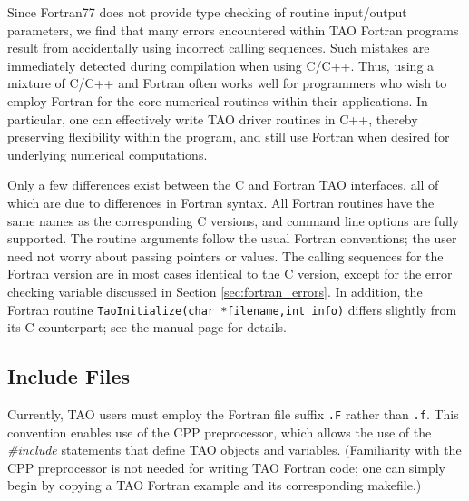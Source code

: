 Since Fortran77 does not provide type checking of routine input/output
parameters, we find that many errors encountered within TAO Fortran
programs result from accidentally using incorrect calling sequences.
Such mistakes are immediately detected during compilation when using
C/C++.  Thus, using a mixture of C/C++ and Fortran often works well
for programmers who wish to employ Fortran for the core numerical
routines within their applications.  In particular, one can
effectively write TAO driver routines in C++, thereby preserving
flexibility within the program, and still use Fortran when desired for
underlying numerical computations.


Only a few differences exist between the C and Fortran TAO interfaces,
all of which are due to differences in Fortran syntax.  All Fortran
routines have the same names as the corresponding C versions, and
command line options are fully supported. The routine arguments follow
the usual Fortran conventions; the user need not worry about passing
pointers or values.  The calling sequences for the Fortran version are
in most cases identical to the C version, except for the error
checking variable discussed in Section \ref{sec:fortran_errors}.  In
addition, the Fortran routine {\tt TaoInitialize(char *filename,int info)}
differs slightly from its C counterpart; see the manual page for
details.


\subsection{Include Files}
\label{sec:fortran_includes}


Currently, TAO users must employ the Fortran file suffix {\tt .F}
rather than {\tt .f}.  This convention enables use of the CPP
preprocessor, which allows the use of the {\em \#include} statements
that define TAO objects and variables. (Familiarity with the CPP
preprocessor is not needed for writing TAO Fortran code; one can
simply begin by copying a TAO Fortran example and its corresponding
makefile.)  

